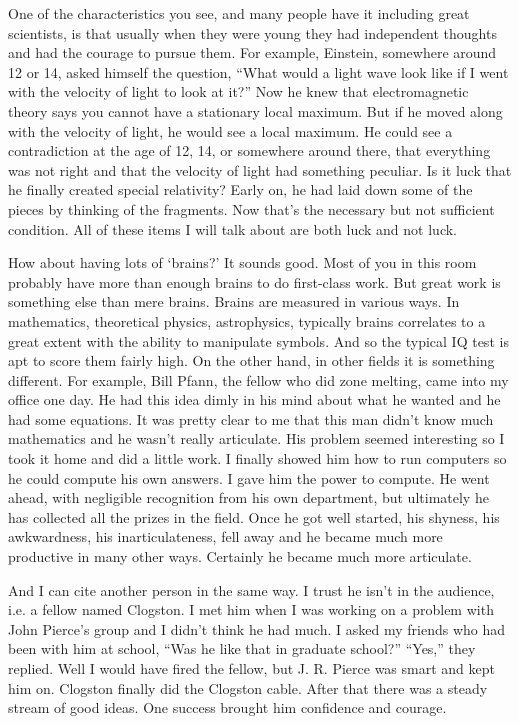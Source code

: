 \documentclass{article}
\begin{document}
One of the characteristics you see, and many people have it including great scientists, is that usually when they were young they had independent thoughts and had the courage to pursue them. For example, Einstein, somewhere around 12 or 14, asked himself the question, ``What would a light wave look like if I went with the velocity of light to look at it?'' Now he knew that electromagnetic theory says you cannot have a stationary local maximum. But if he moved along with the velocity of light, he would see a local maximum. He could see a contradiction at the age of 12, 14, or somewhere around there, that everything was not right and that the velocity of light had something peculiar. Is it luck that he finally created special relativity? Early on, he had laid down some of the pieces by thinking of the fragments. Now that's the necessary but not sufficient condition. All of these items I will talk about are both luck and not luck.

How about having lots of `brains?' It sounds good. Most of you in this room probably have more than enough brains to do first-class work. But great work is something else than mere brains. Brains are measured in various ways. In mathematics, theoretical physics, astrophysics, typically brains correlates to a great extent with the ability to manipulate symbols. And so the typical IQ test is apt to score them fairly high. On the other hand, in other fields it is something different. For example, Bill Pfann, the fellow who did zone melting, came into my office one day. He had this idea dimly in his mind about what he wanted and he had some equations. It was pretty clear to me that this man didn't know much mathematics and he wasn't really articulate. His problem seemed interesting so I took it home and did a little work. I finally showed him how to run computers so he could compute his own answers. I gave him the power to compute. He went ahead, with negligible recognition from his own department, but ultimately he has collected all the prizes in the field. Once he got well started, his shyness, his awkwardness, his inarticulateness, fell away and he became much more productive in many other ways. Certainly he became much more articulate.

And I can cite another person in the same way. I trust he isn't in the audience, i.e. a fellow named Clogston. I met him when I was working on a problem with John Pierce's group and I didn't think he had much. I asked my friends who had been with him at school, ``Was he like that in graduate school?'' ``Yes,'' they replied. Well I would have fired the fellow, but J. R. Pierce was smart and kept him on. Clogston finally did the Clogston cable. After that there was a steady stream of good ideas. One success brought him confidence and courage.
\end{document}
